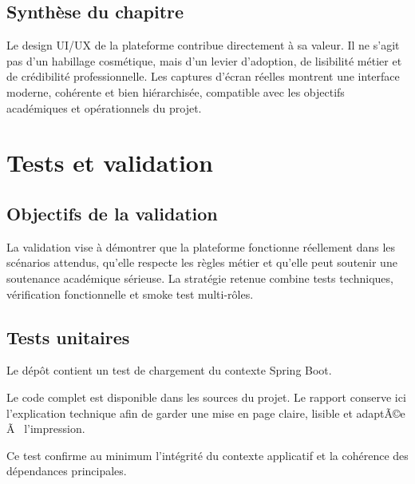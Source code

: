 ﻿\documentclass[12pt,a4paper,oneside]{report}
\newenvironment{codeblock}[1][]{
  \par
  \captionsetup{type=figure}
}{
  \par
}
\begin{document}
\section{Synthèse du chapitre}
Le design UI/UX de la plateforme contribue directement à sa valeur. Il ne s'agit pas d'un habillage cosmétique, mais d'un levier d'adoption, de lisibilité métier et de crédibilité professionnelle. Les captures d'écran réelles montrent une interface moderne, cohérente et bien hiérarchisée, compatible avec les objectifs académiques et opérationnels du projet.












\chapter{Tests et validation}
\label{chap:tests}

\section{Objectifs de la validation}
La validation vise à démontrer que la plateforme fonctionne réellement dans les scénarios attendus, qu'elle respecte les règles métier et qu'elle peut soutenir une soutenance académique sérieuse. La stratégie retenue combine tests techniques, vérification fonctionnelle et smoke test multi-rôles.

\section{Tests unitaires}
Le dépôt contient un test de chargement du contexte Spring Boot.

\begin{codeblock}[H]
\caption{Test automatise de chargement du contexte Spring Boot}
\begin{keybox}
Le code complet est disponible dans les sources du projet. Le rapport conserve ici l'explication technique afin de garder une mise en page claire, lisible et adaptÃ©e Ã  l'impression.
\end{keybox}
\end{codeblock}

Ce test confirme au minimum l'intégrité du contexte applicatif et la cohérence des dépendances principales.
\end{document}
